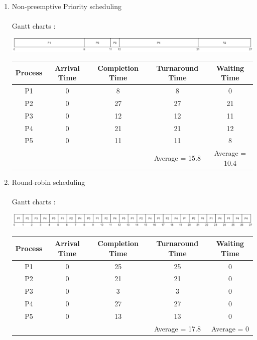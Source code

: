 \documentclass[a4paper]{article}
\begin{document}
\begin{enumerate}[label=\alph*)]
\item Non-preemptive Priority scheduling \\
\\
Gantt charts :
\begin{center}
\includegraphics[scale=0.9]{ex2 priority.png}
\end{center}
\begin{center}
\begin{tabular}{|c|c|c|c|c|}
\hline
Process & Arrival Time & Completion Time & Turnaround Time & Waiting Time \\
\hline
P1 & 0 & 8 & 8 & 0\\
\hline
P2 & 0 & 27 & 27 & 21\\
\hline
P3 & 0 & 12 & 12 & 11\\
\hline
P4 & 0 & 21 & 21 & 12\\
\hline
P5 & 0 & 11 & 11 & 8\\
\hline
&&& Average = 15.8 & Average = 10.4\\ 
\hline
\end{tabular}
\end{center}

\item Round-robin scheduling \\
\\
Gantt charts :
\begin{center}
\includegraphics[scale=0.9]{ex2 rr.png}
\end{center}
\begin{center}
\begin{tabular}{|c|c|c|c|c|}
\hline
Process & Arrival Time & Completion Time & Turnaround Time & Waiting Time \\
\hline
P1 & 0 & 25 & 25 & 0\\
\hline
P2 & 0 & 21 & 21 & 0\\
\hline
P3 & 0 & 3 & 3 & 0\\
\hline
P4 & 0 & 27 & 27 & 0\\
\hline
P5 & 0 & 13 & 13 & 0\\
\hline
&&& Average = 17.8 & Average = 0\\ 
\hline
\end{tabular}
\end{center}

\end{enumerate}
\end{document}
